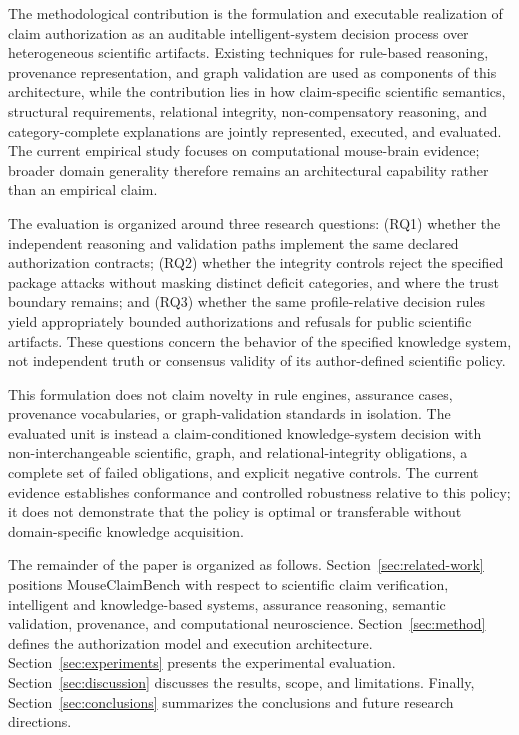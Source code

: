 \documentclass[11pt,a4paper]{article}
\begin{document}
The methodological contribution is the formulation and executable realization
of claim authorization as an auditable intelligent-system decision process
over heterogeneous scientific artifacts. Existing techniques for rule-based
reasoning, provenance representation, and graph validation are used as
components of this architecture, while the contribution lies in how
claim-specific scientific semantics, structural requirements, relational
integrity, non-compensatory reasoning, and category-complete explanations are
jointly represented, executed, and evaluated. The current empirical study
focuses on computational mouse-brain evidence; broader domain generality
therefore remains an architectural capability rather than an empirical claim.

The evaluation is organized around three research questions: (RQ1) whether the independent reasoning and validation paths implement the same declared authorization contracts; (RQ2) whether the integrity controls reject the specified package attacks without masking distinct deficit categories, and where the trust boundary remains; and (RQ3) whether the same profile-relative decision rules yield appropriately bounded authorizations and refusals for public scientific artifacts. These questions concern the behavior of the specified knowledge system, not independent truth or consensus validity of its author-defined scientific policy.

This formulation does not claim novelty in rule engines, assurance cases, provenance vocabularies, or graph-validation standards in isolation. The evaluated unit is instead a claim-conditioned knowledge-system decision with non-interchangeable scientific, graph, and relational-integrity obligations, a complete set of failed obligations, and explicit negative controls. The current evidence establishes conformance and controlled robustness relative to this policy; it does not demonstrate that the policy is optimal or transferable without domain-specific knowledge acquisition.

The remainder of the paper is organized as follows.
Section~\ref{sec:related-work} positions MouseClaimBench with respect to
scientific claim verification, intelligent and knowledge-based systems,
assurance reasoning, semantic validation, provenance, and computational
neuroscience. Section~\ref{sec:method} defines the authorization model and
execution architecture. Section~\ref{sec:experiments} presents the experimental
evaluation. Section~\ref{sec:discussion} discusses the results, scope, and
limitations. Finally, Section~\ref{sec:conclusions} summarizes the conclusions
and future research directions.
\end{document}
